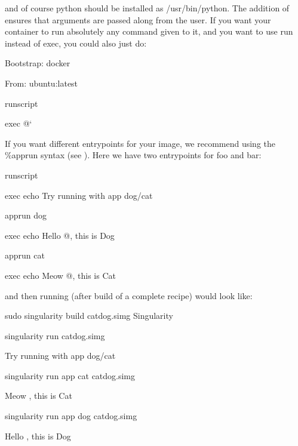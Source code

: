\documentclass[letterpaper,10pt,english]{sphinxmanual}
\begin{document}
and of course python should be installed as /usr/bin/python. The
addition of  ensures that arguments are passed along from the user. If
you want your container to run absolutely any command given to it, and
you want to use run instead of exec, you could also just do:

%
\begin{sphinxVerbatim}[commandchars=\\\{\}]
Bootstrap: docker

From: ubuntu:latest


\PYGZpc{}runscript

exec \PYGZdq{}\PYGZdl{}@\PYGZdq{}{}`
\end{sphinxVerbatim}

If you want different entrypoints for your image, we recommend using the
\%apprun syntax (see ). Here we have two entrypoints for foo and bar:

%
\begin{sphinxVerbatim}[commandchars=\\\{\}]
\PYGZpc{}runscript

exec echo \PYGZdq{}Try running with \PYGZhy{}\PYGZhy{}app dog/cat\PYGZdq{}


\PYGZpc{}apprun dog

exec echo Hello \PYGZdq{}\PYGZdl{}@\PYGZdq{}, this is Dog


\PYGZpc{}apprun cat

exec echo Meow \PYGZdq{}\PYGZdl{}@\PYGZdq{}, this is Cat
\end{sphinxVerbatim}

and then running (after build of a complete recipe) would look like:

%
\begin{sphinxVerbatim}[commandchars=\\\{\}]
sudo singularity build catdog.simg Singularity


\PYGZdl{} singularity run catdog.simg

Try running with \PYGZhy{}\PYGZhy{}app dog/cat


\PYGZdl{} singularity run \PYGZhy{}\PYGZhy{}app cat catdog.simg

Meow , this is Cat

\PYGZdl{} singularity run \PYGZhy{}\PYGZhy{}app dog catdog.simg

Hello , this is Dog
\end{sphinxVerbatim}
\end{document}
